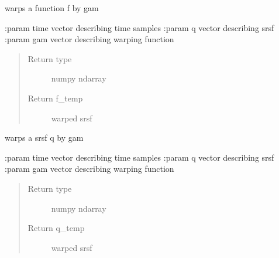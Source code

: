 \documentclass[letterpaper,10pt,english]{sphinxmanual}
\begin{document}

\begin{fulllineitems}
\label{\detokenize{utility_functions:utility_functions.warp_f_gamma}}
warps a function f by gam

:param time vector describing time samples
:param q vector describing srsf
:param gam vector describing warping function
\begin{quote}\begin{description}
\item[{Return type}] \leavevmode
numpy ndarray

\item[{Return f\_temp}] \leavevmode
warped srsf

\end{description}\end{quote}

\end{fulllineitems}


\begin{fulllineitems}
\label{\detokenize{utility_functions:utility_functions.warp_q_gamma}}
warps a srsf q by gam

:param time vector describing time samples
:param q vector describing srsf
:param gam vector describing warping function
\begin{quote}\begin{description}
\item[{Return type}] \leavevmode
numpy ndarray

\item[{Return q\_temp}] \leavevmode
warped srsf

\end{description}\end{quote}

\end{fulllineitems}
\end{document}
